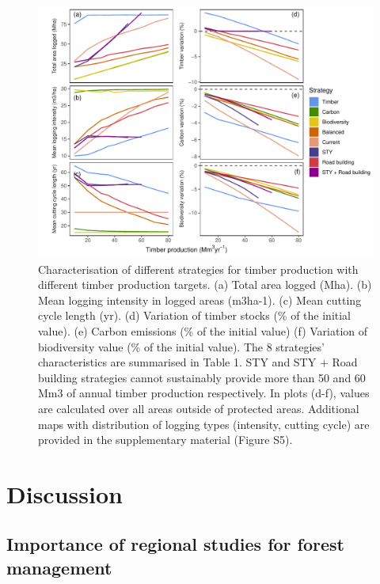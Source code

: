 \documentclass{article}
\begin{document}
\begin{figure}
    \centering
    \includegraphics[width=\linewidth]{graphs/increasingDemand.pdf}
    \caption{ Characterisation of different strategies for timber production with different timber production targets. (a) Total area logged (Mha). (b) Mean logging intensity in logged areas (m3ha-1). (c) Mean cutting cycle length (yr). (d) Variation of timber stocks (\% of the initial value). (e) Carbon emissions (\% of the initial value) (f) Variation of biodiversity value (\% of the initial value). The 8 strategies' characteristics are summarised in Table 1. STY and STY + Road building strategies cannot sustainably provide more than 50 and 60 Mm3 of annual timber production respectively. In plots (d-f), values are calculated over all areas outside of protected areas. Additional maps with distribution of logging types (intensity, cutting cycle) are provided in the supplementary material (Figure S5).
}
    \label{fig:incDemand}
\end{figure}

\section{Discussion}

\subsection{Importance of regional studies for forest management}
\end{document}
